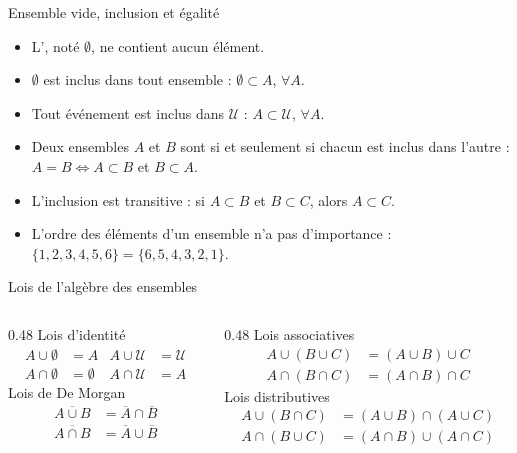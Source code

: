 \documentclass{BeamerTemplate}
\begin{document}
\begin{frame}[t]{Ensemble vide, inclusion et égalité}
\begin{itemize}
    \item L', noté $\emptyset$, ne contient aucun élément.
    \item $\emptyset$ est inclus dans tout ensemble : $\emptyset \subset A$, $\forall A$.
    \item Tout événement est inclus dans $\mathcal{U}$ : $A\subset \mathcal{U}$, $\forall A$.
    \item Deux ensembles $A$ et $B$ sont  si et seulement si chacun est inclus dans l'autre :\\
    $A=B \iff A\subset B$ et $B\subset A$.
    \item L'inclusion est transitive : si $A\subset B$ et $B\subset C$, alors $A\subset C$.
    \item L'ordre des éléments d'un ensemble n'a pas d'importance :\\
    $\{1,2,3,4,5,6\}=\{6,5,4,3,2,1\}$.
\end{itemize}
\end{frame}

\begin{frame}[t]{Lois de l'algèbre des ensembles}
\small
\begin{columns}[T]
\begin{column}{0.48\textwidth}
    Lois d'identité
    \begin{align*}
        A\cup \emptyset &= A & A\cup \mathcal{U} &= \mathcal{U}\\
        A\cap \emptyset &= \emptyset & A\cap \mathcal{U} &= A
    \end{align*}
    Lois de De Morgan
    \begin{align*}
        \overline{A\cup B}&=\overline{A}\cap \overline{B}\\
        \overline{A\cap B}&=\overline{A}\cup \overline{B}
    \end{align*}
\end{column}
\begin{column}{0.48\textwidth}
    Lois associatives
    \begin{align*}
        A\cup (B\cup C) &= (A\cup B)\cup C\\
        A\cap (B\cap C) &= (A\cap B)\cap C
    \end{align*}
    Lois distributives
    \begin{align*}
        A\cup (B\cap C) &= (A\cup B)\cap (A \cup C)\\
        A\cap (B\cup C) &= (A\cap B)\cup (A \cap C)
    \end{align*}
\end{column}
\end{columns}
\end{frame}
\end{document}
